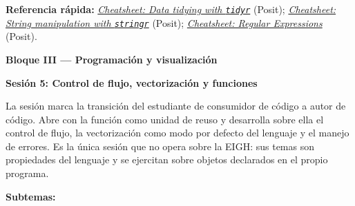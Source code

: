 \documentclass[11pt,letterpaper]{article}
\newcommand{\bloqueCurso}[1]{%
  \clearpage%
  \vspace*{0.5cm}%
  {\centering\color{main}\fontsize{26pt}{32pt}\selectfont\bfseries #1\par}%
  \vspace{0.8cm}%
}
\newcommand{\sesion}[2]{%
  \bigskip%
  {\color{main}\Large\bfseries Sesión #1: #2\par}%
  \smallskip%
}
\newcommand{\cheatsheet}[2]{%
  \href{https://rstudio.github.io/cheatsheets/#1.pdf}{\textit{Cheatsheet: #2}}%
}
\begin{document}
\medskip
\noindent\textbf{Referencia rápida:} \cheatsheet{tidyr}{Data tidying with \texttt{tidyr}} (Posit); \cheatsheet{strings}{String manipulation with \texttt{stringr}} (Posit); \cheatsheet{regex}{Regular Expressions} (Posit).

\bloqueCurso{Bloque III --- Programación y visualización}

\sesion{5}{Control de flujo, vectorización y funciones}

La sesión marca la transición del estudiante de consumidor de código a autor de código. Abre con la función como unidad de reuso y desarrolla sobre ella el control de flujo, la vectorización como modo por defecto del lenguaje y el manejo de errores. Es la única sesión que no opera sobre la EIGH: sus temas son propiedades del lenguaje y se ejercitan sobre objetos declarados en el propio programa.

\textbf{Subtemas:}
\end{document}
